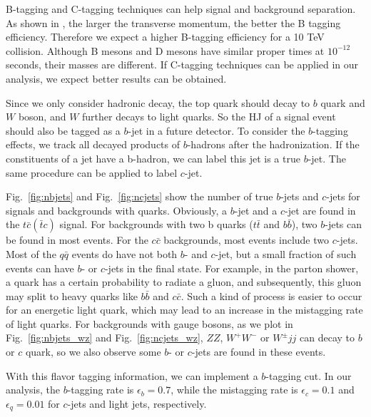 \documentclass[a4paper,11pt]{article}
\begin{document}
B-tagging and C-tagging techniques can help signal and background separation. 
As shown in \cite{ATLAS:2019bwq}, the larger the transverse momentum, the better the B tagging efficiency. 
Therefore we expect a higher B-tagging efficiency for a 10 TeV collision. 
Although B mesons and D mesons have similar proper times at $10^{-12}$ seconds, their masses are different. 
If C-tagging techniques \cite{ATLAS:2021cxe} can be applied in our analysis, we expect better results can be obtained. 

Since we only consider hadronic decay, the top quark should decay to $b$ quark and $W$ boson, 
and $W$ further decays to light quarks. 
So the HJ of a signal event should also be tagged as a $b$-jet in a future detector. 
To consider the $b$-tagging effects, we track all decayed products of $b$-hadrons after the hadronization. 
If the constituents of a jet have a b-hadron, we can label this jet is a true $b$-jet. 
The same procedure can be applied to label $c$-jet. 

Fig.~\ref{fig:nbjets} and Fig.~\ref{fig:ncjets} show the number of true $b$-jets and $c$-jets for signals and backgrounds with quarks.
Obviously, a $b$-jet and a $c$-jet are found in the $t\bar{c}(\bar{t}c)$ signal. 
For backgrounds with two b quarks ($t\bar{t}$ and $b\bar{b}$), two $b$-jets can be found in most events.
For the $c\bar{c}$ backgrounds, most events include two $c$-jets.
Most of the $q\bar{q}$ events do have not both $b$- and $c$-jet, 
but a small fraction of such events can have $b$- or $c$-jets in the final state.  
For example, in the parton shower, a quark has a certain probability to radiate a gluon, 
and subsequently, this gluon may split to heavy quarks like $b\bar{b}$ and $c\bar{c}$. 
Such a kind of process is easier to occur for an energetic light quark,  
which may lead to an increase in the mistagging rate of light quarks. 
For backgrounds with gauge bosons, as we plot in Fig.~\ref{fig:nbjets_wz} and Fig.~\ref{fig:ncjets_wz}, 
$ZZ$, $W^+W^-$ or $W^{\pm}jj$ can decay to $b$ or $c$ quark, 
so we also observe some $b$- or $c$-jets are found in these events.

With this flavor tagging information, we can implement a $b$-tagging cut. 
In our analysis, the $b$-tagging rate is $\epsilon_{b}=0.7$, 
while the mistagging rate is $\epsilon_{c}=0.1$ and $\epsilon_{q}=0.01$ for $c$-jets and light jets, respectively.
\end{document}
